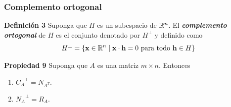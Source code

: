 \begin{frame}\frametitle{Complemento ortogonal}
	
	\begin{defi}{\textbf{Definición 3}}
		\justifying
		Suponga que $H$ es un subespacio de $\mathbb{R}^n$. El \textbf{\textit{complemento ortogonal}} de $H$ es el conjunto denotado
		por $H^{\perp}$ y definido como
		\[
		H^{\perp} = \{ \mathbf{x}\in\mathbb{R}^n \mid  \mathbf{x}\cdot \mathbf{h}=0 \text{ para todo } \mathbf{h}\in H \}
		\]
		
		\vspace{-1mm}
	\end{defi}	
	
	\begin{prop}{\textbf{Propiedad 9}}
		Suponga que $A$ es una matriz $m\times n$. Entonces		
		\begin{enumerate}[$a$]\justifying
			\item ${C_A}^{\perp} = N_{A^T}$.
			\item ${N_{A}}^{\perp} = R_{A}$.
		\end{enumerate}
	\end{prop}	
	
\end{frame}


\subsection{}

